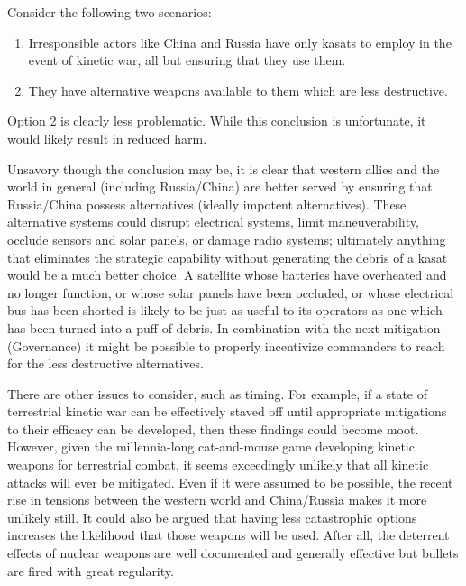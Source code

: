 Consider the following two scenarios:

\begin{enumerate}
\item Irresponsible actors like China and Russia have only \acp{kasat}
  to employ in the event of kinetic war, all but ensuring that they
  use them.

\item They have alternative weapons available to them which are less
  destructive.
\end{enumerate}

Option 2 is clearly less problematic.  While this conclusion is
unfortunate, it would likely result in reduced harm.

Unsavory though the conclusion may be, it is clear that western allies
and the world in general (including Russia/China) are better served by
ensuring that Russia/China possess alternatives (ideally impotent
alternatives).  These alternative systems could disrupt electrical
systems, limit maneuverability, occlude sensors and solar panels, or
damage radio systems; ultimately anything that eliminates the
strategic capability without generating the debris of a \ac{kasat}
would be a much better choice.  A satellite whose batteries have
overheated and no longer function, or whose solar panels have been
occluded, or whose electrical bus has been shorted is likely to be
just as useful to its operators as one which has been turned into a
puff of debris.  In combination with the next mitigation (Governance)
it might be possible to properly incentivize commanders to reach for
the less destructive alternatives.

There are other issues to consider, such as timing.  For example, if a
state of terrestrial kinetic war can be effectively staved off until
appropriate mitigations to their efficacy can be developed, then these
findings could become moot.  However, given the millennia-long
cat-and-mouse game developing kinetic weapons for terrestrial combat,
it seems exceedingly unlikely that all kinetic attacks will ever be
mitigated.  Even if it were assumed to be possible, the recent rise in
tensions between the western world and China/Russia makes it more
unlikely still. It could also be argued that having less catastrophic
options increases the likelihood that those weapons will be used.
After all, the deterrent effects of nuclear weapons are well
documented and generally effective\cite{getting-mad} but bullets are
fired with great regularity.

